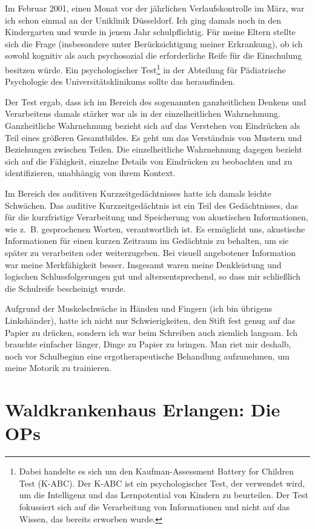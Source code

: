 \documentclass[fontsize=14pt,a4paper,headinclude,DIV=calc,automark]{scrbook}
\begin{document}
Im Februar 2001, einen Monat vor der jährlichen Verlaufskontrolle im März, war ich schon einmal an der Uniklinik Düsseldorf. Ich ging damals noch in den Kindergarten und wurde in jenem Jahr schulpflichtig. Für meine Eltern stellte sich die Frage (insbesondere unter Berücksichtigung meiner Erkrankung), ob ich sowohl kognitiv als auch psychosozial die erforderliche Reife für die Einschulung besitzen würde. Ein psychologischer Test\footnote{Dabei handelte es sich um den Kaufman-Assessment Battery for Children Test (K-ABC). Der K-ABC ist ein psychologischer Test, der verwendet wird, um die Intelligenz und das Lernpotential von Kindern zu beurteilen. Der Test fokussiert sich auf die Verarbeitung von Informationen und nicht auf das Wissen, das bereits erworben wurde.} in der Abteilung für Pädiatrische Psychologie des Universitätsklinikums sollte das herausfinden.

Der Test ergab, dass ich im Bereich des sogenannten ganzheitlichen Denkens und Verarbeitens damals stärker war als in der einzelheitlichen Wahrnehmung. Ganzheitliche Wahrnehmung bezieht sich auf das Verstehen von Eindrücken als Teil eines größeren Gesamtbildes. Es geht um das Verständnis von Mustern und Beziehungen zwischen Teilen. Die einzelheitliche Wahrnehmung dagegen bezieht sich auf die Fähigkeit, einzelne Details von Eindrücken zu beobachten und zu identifizieren, unabhängig von ihrem Kontext.

Im Bereich des auditiven Kurzzeitgedächtnisses hatte ich damals leichte Schwächen. Das auditive Kurzzeitgedächtnis ist ein Teil des Gedächtnisses, das für die kurzfristige Verarbeitung und Speicherung von akustischen Informationen, wie z.~B. gesprochenen Worten, verantwortlich ist. Es ermöglicht uns, akustische Informationen für einen kurzen Zeitraum im Gedächtnis zu behalten, um sie später zu verarbeiten oder weiterzugeben. Bei visuell angebotener Information war meine Merkfähigkeit besser. Insgesamt waren meine Denkleistung und logischen Schlussfolgerungen gut und altersentsprechend, so dass mir schließlich die Schulreife bescheinigt wurde.

Aufgrund der Muskelschwäche in Händen und Fingern (ich bin übrigens Linkshänder), hatte ich nicht nur Schwierigkeiten, den Stift fest genug auf das Papier zu drücken, sondern ich war beim Schreiben auch ziemlich langsam. Ich brauchte einfacher länger, Dinge zu Papier zu bringen. Man riet mir deshalb, noch vor Schulbeginn eine ergotherapeutische Behandlung aufzunehmen, um meine Motorik zu trainieren.

\section{Waldkrankenhaus Erlangen: Die OPs}
\end{document}
